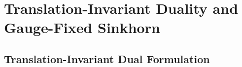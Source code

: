 \documentclass{article}
\begin{document}









\section{Translation-Invariant Duality and Gauge-Fixed Sinkhorn}
\subsection{Translation-Invariant Dual Formulation}
\label{dualformsection}
\end{document}
